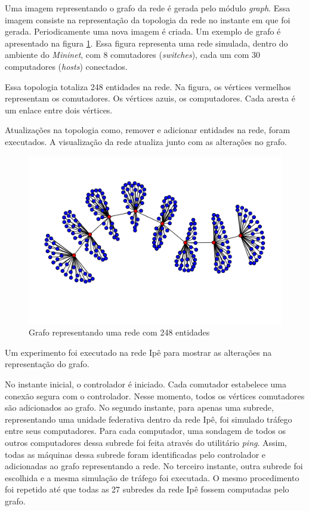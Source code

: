 Uma imagem representando o grafo da rede é gerada pelo módulo \emph{graph}.
Essa imagem consiste na representação da topologia da rede no instante 
em que foi gerada. 
Periodicamente uma nova imagem é criada.
Um exemplo de grafo é apresentado na figura \ref{fig:full-graph}.
Essa figura representa uma rede simulada, dentro do ambiente do 
\emph{Mininet}, com 8 comutadores (\emph{switches}), cada um com 30 
computadores (\emph{hosts}) conectados.

Essa topologia totaliza 248 entidades na rede.
Na figura, os vértices vermelhos representam os comutadores.
Os vértices azuis, os computadores.
Cada aresta é um enlace entre dois vértices.

Atualizações na topologia como, remover e adicionar entidades na rede, foram
executados.
A visualização da rede atualiza junto com as alterações no grafo.

\begin{figure}[h!]
    \centering
    \includegraphics[width=\textwidth]{img/full-graph}
    \caption{Grafo representando uma rede com 248 entidades}
    \label{fig:full-graph}
\end{figure}
\break
Um experimento foi executado na rede Ipê para mostrar as alterações na 
representação do grafo.

No instante inicial, o controlador é iniciado.
Cada comutador estabelece uma conexão segura com o controlador.
Nesse momento, todos os vértices comutadores são adicionados ao grafo.
No segundo instante, para apenas uma subrede, representando uma unidade 
federativa dentro da rede Ipê, foi simulado tráfego entre seus computadores.
Para cada computador, uma sondagem de todos os outros computadores dessa
subrede foi feita através do utilitário \emph{ping}.
Assim, todas as máquinas dessa subrede foram identificadas pelo controlador
e adicionadas ao grafo representando a rede.
No terceiro instante, outra subrede foi escolhida e a mesma simulação de 
tráfego foi executada.
O mesmo procedimento foi repetido até que todas as 27 subredes da rede Ipê
fossem computadas pelo grafo.

